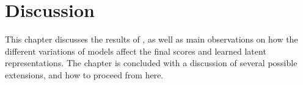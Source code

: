 \chapter{Discussion}\label{ch:Discussion}

This chapter discusses the results of , as well as main observations on how the different variations of models affect the final scores and learned latent representations. The chapter is concluded with a discussion of several possible extensions, and how to proceed from here.





